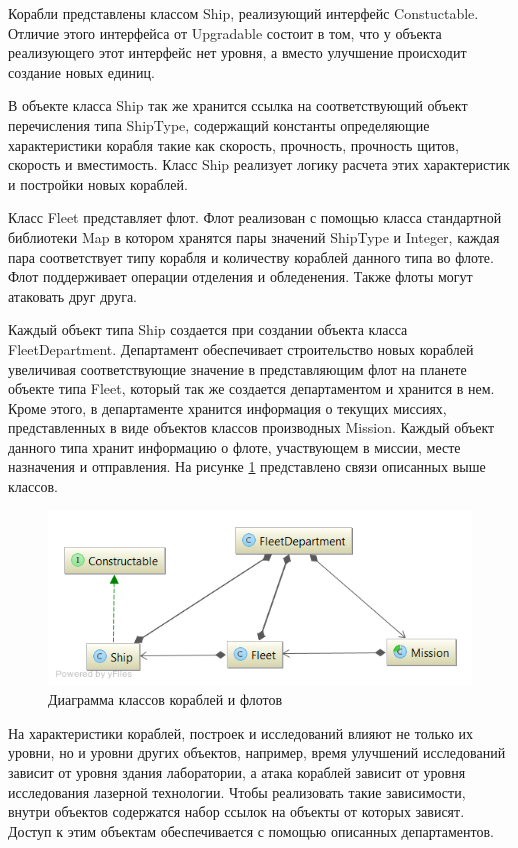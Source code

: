 Корабли представлены классом Ship, реализующий интерфейс Constuctable. Отличие этого интерфейса от Upgradable состоит в том, что у объекта реализующего этот интерфейс нет уровня, а вместо улучшение происходит создание новых единиц.

В объекте класса Ship так же хранится ссылка на соответствующий объект перечисления типа ShipType, содержащий константы определяющие характеристики корабля такие как скорость, прочность, прочность щитов, скорость и вместимость. Класс Ship реализует логику расчета этих характеристик и постройки новых кораблей.

Класс Fleet представляет флот. Флот реализован с помощью класса стандартной библиотеки Map в котором хранятся пары значений ShipType и Integer, каждая пара соответствует типу корабля и количеству кораблей данного типа во флоте. Флот поддерживает операции отделения и обледенения. Также флоты могут атаковать друг друга.

Каждый объект типа Ship создается при создании объекта класса FleetDepartment. Департамент обеспечивает строительство новых кораблей увеличивая соответствующие значение в представляющим флот на планете объекте типа Fleet, который так же создается департаментом и хранится в нем. Кроме этого, в департаменте хранится информация о текущих миссиях, представленных в виде объектов классов производных Mission. Каждый объект данного типа хранит информацию о флоте, участвующем в миссии, месте назначения и отправления. 
На рисунке \ref{pic:d5} представлено связи описанных выше классов.
 
\begin{figure}[H]
\centering
\includegraphics[scale=0.5]{diagram5.png}
\caption{Диаграмма классов кораблей и флотов}
\label{pic:d5}
\end{figure}

На характеристики кораблей, построек и исследований влияют не только их уровни, но и уровни других объектов, например, время улучшений исследований зависит от уровня здания лаборатории, а атака кораблей зависит от уровня исследования лазерной технологии. Чтобы реализовать такие зависимости, внутри объектов содержатся набор ссылок на объекты от которых зависят. Доступ к этим объектам обеспечивается с помощью описанных департаментов.

